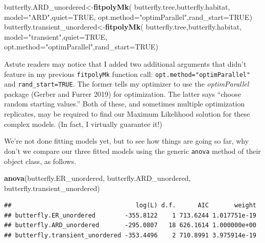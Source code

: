 \documentclass[fleqn,10pt,lineno]{wlpeerj} %
\newenvironment{Shaded}{\begin{snugshade}}{\end{snugshade}}
\newcommand{\AttributeTok}[1]{\textcolor[rgb]{0.13,0.29,0.53}{#1}}
\newcommand{\ConstantTok}[1]{\textcolor[rgb]{0.56,0.35,0.01}{#1}}
\newcommand{\FunctionTok}[1]{\textcolor[rgb]{0.13,0.29,0.53}{\textbf{#1}}}
\newcommand{\NormalTok}[1]{#1}
\newcommand{\OtherTok}[1]{\textcolor[rgb]{0.56,0.35,0.01}{#1}}
\newcommand{\StringTok}[1]{\textcolor[rgb]{0.31,0.60,0.02}{#1}}
\begin{document}
\begin{Shaded}
\begin{Highlighting}[]
\NormalTok{butterfly.ARD\_unordered}\OtherTok{\textless{}{-}}\FunctionTok{fitpolyMk}\NormalTok{(}
\NormalTok{  butterfly.tree,butterfly.habitat,}
  \AttributeTok{model=}\StringTok{"ARD"}\NormalTok{,}\AttributeTok{quiet=}\ConstantTok{TRUE}\NormalTok{,}
  \AttributeTok{opt.method=}\StringTok{"optimParallel"}\NormalTok{,}\AttributeTok{rand\_start=}\ConstantTok{TRUE}\NormalTok{)}
\NormalTok{butterfly.transient\_unordered}\OtherTok{\textless{}{-}}\FunctionTok{fitpolyMk}\NormalTok{(}
\NormalTok{  butterfly.tree,butterfly.habitat,}
  \AttributeTok{model=}\StringTok{"transient"}\NormalTok{,}\AttributeTok{quiet=}\ConstantTok{TRUE}\NormalTok{,}
  \AttributeTok{opt.method=}\StringTok{"optimParallel"}\NormalTok{,}\AttributeTok{rand\_start=}\ConstantTok{TRUE}\NormalTok{)}
\end{Highlighting}
\end{Shaded}

Astute readers may notice that I added two additional arguments that didn't feature in my previous \texttt{fitpolyMk} function call: \texttt{opt.method="optimParallel"} and \texttt{rand\_start=TRUE}. The former tells my optimizer to use the \emph{optimParallel} package (Gerber and Furrer 2019) for optimization. The latter says ``choose random starting values.'' Both of these, and sometimes multiple optimization replicates, may be required to find our Maximum Likelihood solution for these complex models. (In fact, I virtually guarantee it!)

We're not done fitting models yet, but to see how things are going so far, why don't we compare our three fitted models using the generic \texttt{anova} method of their object class, as follows.

\begin{Shaded}
\begin{Highlighting}[]
\FunctionTok{anova}\NormalTok{(butterfly.ER\_unordered,}
\NormalTok{  butterfly.ARD\_unordered,}
\NormalTok{  butterfly.transient\_unordered)}
\end{Highlighting}
\end{Shaded}

\begin{verbatim}
##                                  log(L) d.f.      AIC       weight
## butterfly.ER_unordered        -355.8122    1 713.6244 1.017751e-19
## butterfly.ARD_unordered       -295.0807   18 626.1614 1.000000e+00
## butterfly.transient_unordered -353.4496    2 710.8991 3.975914e-19
\end{verbatim}
\end{document}
